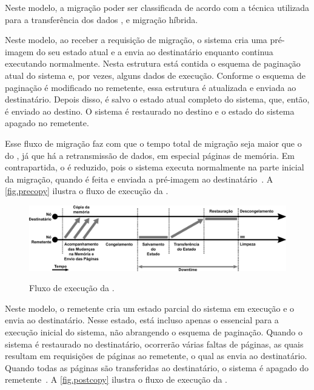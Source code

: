 Neste modelo, a migração poder ser classificada de acordo com a técnica utilizada para a transferência dos dados \ie \precopymigration, \postcopymigration e migração híbrida.

\subsubsubsection{\Precopymigration}\label{sec.precopymigration}
Neste modelo, ao receber a requisição de migração, o sistema cria uma pré-imagem do seu estado atual e a envia ao destinatário enquanto continua executando normalmente. Nesta estrutura está contida o esquema de paginação atual do sistema e, por vezes, alguns dados de execução. Conforme o esquema de paginação é modificado no remetente, essa estrutura é atualizada e enviada ao destinatário. Depois disso, é salvo o estado atual completo do sistema, que, então, é enviado ao destino. O sistema é restaurado no destino e o estado do sistema apagado no remetente. 

Esse fluxo de migração faz com que o tempo total de migração seja maior que o do \coldmigration, já que há a retransmissão de dados, em especial páginas de memória. Em contrapartida, o \downtime é reduzido, pois o sistema executa normalmente na parte inicial da migração, quando é feita e enviada a pré-imagem ao destinatário~\cite{singh2022predictive, imran2022live}. A \autoref{fig.precopy} ilustra o fluxo de execução da \precopymigration.

\begin{figure}[bt]
    \centering
    \caption{Fluxo de execução da \precopymigration.}
    \includegraphics[width=0.8\linewidth]{content/images/pre-copy-migration-flow.pdf}
    \label{fig.precopy}
\end{figure}

\subsubsubsection{\Postcopymigration}\label{sec.postcopymigration}
Neste modelo, o remetente cria um estado parcial do sistema em execução e o envia ao destinatário. Nesse estado, está incluso apenas o essencial para a execução inicial do sistema, não abrangendo o esquema de paginação. Quando o sistema é restaurado no destinatário, ocorrerão várias faltas de páginas, as quais resultam em requisições de páginas ao remetente, o qual as envia ao destinatário. Quando todas as páginas são transferidas ao destinatário, o sistema é apagado do remetente~\cite{singh2022predictive, imran2022live}. A \autoref{fig.postcopy} ilustra o fluxo de execução da \postcopymigration.


